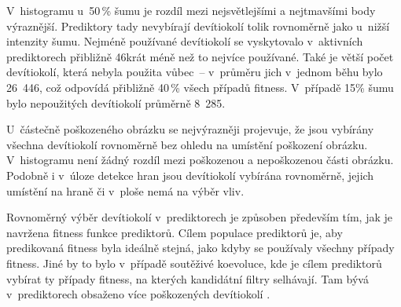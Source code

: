 V~histogramu u~50\,\% šumu je rozdíl mezi nejsvětlejšími a nejtmavšími body výraznější. Prediktory tady nevybírají devítiokolí tolik rovnoměrně jako u~nižší intenzity šumu. Nejméně používané devítiokolí se vyskytovalo v~aktivních prediktorech přibližně 46krát méně než to nejvíce používané. Také je větší počet devítiokolí, která nebyla použita vůbec~-- v~průměru jich v~jednom běhu bylo 26~446, což odpovídá přibližně 40\,\% všech případů fitness. V~případě 15\% šumu bylo nepoužitých devítiokolí průměrně 8~285.

U~částečně poškozeného obrázku se nejvýrazněji projevuje, že jsou vybírány všechna devítiokolí rovnoměrně bez ohledu na umístění poškození obrázku. V~histogramu není žádný rozdíl mezi poškozenou a nepoškozenou části obrázku. Podobně i v~úloze detekce hran jsou devítiokolí vybírána rovnoměrně, jejich umístění na hraně či v~ploše nemá na výběr vliv.

Rovnoměrný výběr devítiokolí v~prediktorech je způsoben především tím, jak je navržena fitness funkce prediktorů. Cílem populace prediktorů je, aby predikovaná fitness byla ideálně stejná, jako kdyby se používaly všechny případy fitness. Jiné by to bylo v~případě soutěživé koevoluce, kde je cílem prediktorů vybírat ty případy fitness, na kterých kandidátní filtry selhávají. Tam bývá v~prediktorech obsaženo více poškozených devítiokolí \cite{SikuPPSN}.

